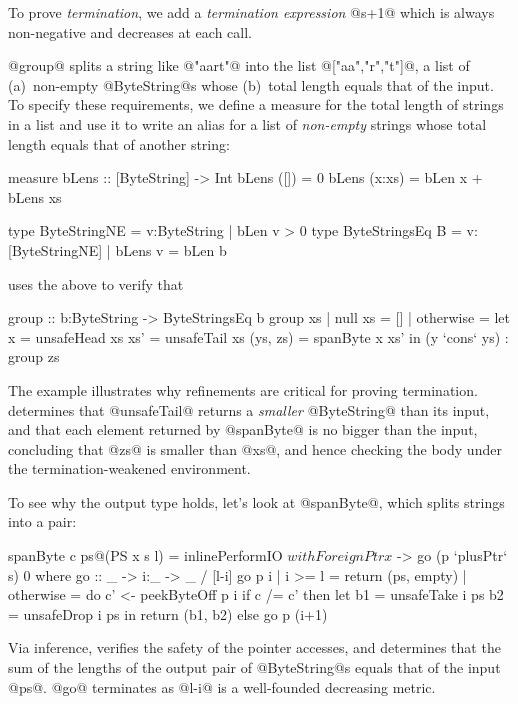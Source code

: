 To prove \emph{termination}, we add a \emph{termination expression} 
@s+1@ which is always non-negative and decreases at each call.

@group@ splits a string like @"aart"@ into the list
@["aa","r","t"]@, \ie a list of
(a)~non-empty @ByteString@s whose 
(b)~total length equals that of the input. 
To specify these requirements, we define a measure for 
the total length of strings in a list and use it to
write an alias for a list of \emph{non-empty} strings
whose total length equals that of another string:

\begin{code}
  measure bLens :: [ByteString] -> Int 
  bLens ([])     = 0
  bLens (x:xs)   = bLen x + bLens xs
  
  type ByteStringNE 
    = {v:ByteString | bLen v > 0}
  type ByteStringsEq B
    = {v:[ByteStringNE] | bLens v = bLen b}
\end{code}
%
\toolname uses the above to verify that
%
\begin{code}
  group :: b:ByteString -> ByteStringsEq b
  group xs
   | null xs   = []
   | otherwise = let x        = unsafeHead xs
                     xs'      = unsafeTail xs
                     (ys, zs) = spanByte x xs' 
                 in (y `cons` ys) : group zs
\end{code}
%
The example illustrates why refinements are critical for
proving termination. \toolname determines that @unsafeTail@ 
returns a \emph{smaller} @ByteString@ than its input, and that
each element returned by @spanByte@ is no bigger than the 
input, concluding that @zs@ is smaller than @xs@, and hence
checking the body under the termination-weakened environment.

To see why the output type holds, let's look at @spanByte@,
which splits strings into a pair:
%
\begin{code}
  spanByte c ps@(PS x s l) 
    = inlinePerformIO $ withForeignPtr x $
          \p -> go (p `plusPtr` s) 0
    where
      go :: _ -> i:_ -> _ / [l-i]
      go p i 
        | i >= l    = return (ps, empty)
        | otherwise = do
            c' <- peekByteOff p i
            if c /= c'
              then let b1 = unsafeTake i ps
                       b2 = unsafeDrop i ps
                   in  return (b1, b2)
              else go p (i+1)
\end{code}
%
Via inference, \toolname verifies the safety of 
the pointer accesses, and determines that the 
sum of the lengths of the output pair of 
@ByteString@s equals that of the input @ps@.
@go@ terminates as @l-i@ is a well-founded 
decreasing metric.

